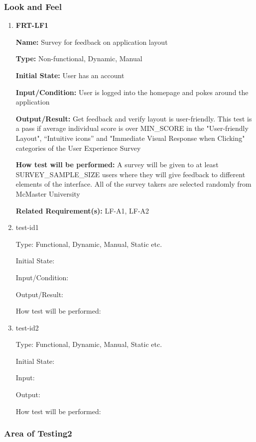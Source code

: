 \documentclass[12pt, titlepage]{article}
\begin{document}
\subsubsection{Look and Feel}

\begin{enumerate}
\item{\textbf{FRT-LF1}}

\textbf{Name:} Survey for feedback on application layout

\textbf{Type:} Non-functional, Dynamic, Manual
					
\textbf{Initial State:} User has an account

\textbf{Input/Condition:} User is logged into the homepage and pokes around the application
					
\textbf{Output/Result:} Get feedback and verify layout is user-friendly. This test is a pass if average individual score is over MIN\_SCORE in the "User-friendly Layout", “Intuitive icons” and "Immediate Visual Response when Clicking" categories of the User Experience Survey
					
\textbf{How test will be performed:} A survey will be given to at least
SURVEY\_SAMPLE\_SIZE users where they will give feedback to different elements of the interface. All of the survey takers are selected randomly from McMaster University

\textbf{Related Requirement(s):} LF-A1, LF-A2

\item{test-id1\\}

Type: Functional, Dynamic, Manual, Static etc.
					
Initial State: 
					
Input/Condition: 
					
Output/Result: 
					
How test will be performed: 
					
\item{test-id2\\}

Type: Functional, Dynamic, Manual, Static etc.
					
Initial State: 
					
Input: 
					
Output: 
					
How test will be performed: 

\end{enumerate}

\subsubsection{Area of Testing2}
\end{document}
